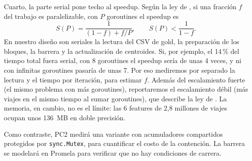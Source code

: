 Cuarto, la parte serial pone techo al speedup. Según la ley de \textcite{amdahl1967}, si
una fracción $f$ del trabajo es paralelizable, con $P$ goroutines el speedup es
\[
  S(P) = \frac{1}{(1-f) + f/P}, \qquad S(P) < \frac{1}{1-f}.
\]
En nuestro diseño son seriales la lectura del CSV de gold, la preparación de los bloques, la
barrera y la actualización de centroides. Si, por ejemplo, el 14\,\% del tiempo total fuera
serial, con 8 goroutines el speedup sería de unas 4 veces, y ni con infinitas goroutines pasaría de unas 7.
Por eso mediremos por separado la lectura y el tiempo por iteración, para estimar $f$. Además del
escalamiento fuerte (el mismo problema con más goroutines), reportaremos el escalamiento débil
(más viajes en el mismo tiempo al sumar goroutines), que describe la ley de \textcite{gustafson1988}. La memoria, en cambio, no es el límite: las 6 features de 2,8 millones
de viajes ocupan unos 136~MB en doble precisión.

Como contraste, PC2 medirá una variante con acumuladores compartidos protegidos por
\texttt{sync.Mutex}, para cuantificar el costo de la contención. La barrera se modelará en Promela
para verificar que no hay condiciones de carrera.
